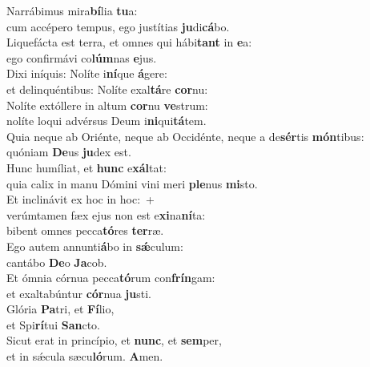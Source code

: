 \evenverse Narrábimus mira\textbf{bí}lia \textbf{tu}a:~\*\\
\evenverse cum accépero tempus, ego justítias \textbf{ju}di\textbf{cá}bo.\\
\oddverse Liquefácta est terra, et omnes qui hábi\textbf{tant} in \textbf{e}a:~\*\\
\oddverse ego confirmávi co\textbf{lúm}nas \textbf{e}jus.\\
\evenverse Dixi iníquis: Nolíte i\textbf{ní}que \textbf{á}gere:~\*\\
\evenverse et delinquéntibus: Nolíte exal\textbf{tá}re \textbf{cor}nu:\\
\oddverse Nolíte extóllere in altum \textbf{cor}nu \textbf{ve}strum:~\*\\
\oddverse nolíte loqui advérsus Deum i\textbf{ni}qui\textbf{tá}tem.\\
\evenverse Quia neque ab Oriénte, neque ab Occidénte, neque a de\textbf{sér}tis \textbf{món}tibus:~\*\\
\evenverse quóniam \textbf{De}us \textbf{ju}dex est.\\
\oddverse Hunc humíliat, et \textbf{hunc} e\textbf{xál}tat:~\*\\
\oddverse quia calix in manu Dómini vini meri \textbf{ple}nus \textbf{mi}sto.\\
\evenverse Et inclinávit ex hoc in hoc:~+\\
\evenverse  verúmtamen fæx ejus non est e\textbf{xi}na\textbf{ní}ta:~\*\\
\evenverse bibent omnes pecca\textbf{tó}res \textbf{ter}ræ.\\
\oddverse Ego autem annunti\textbf{á}bo in \textbf{sǽ}culum:~\*\\
\oddverse cantábo \textbf{De}o \textbf{Ja}cob.\\
\evenverse Et ómnia córnua pecca\textbf{tó}rum con\textbf{frín}gam:~\*\\
\evenverse et exaltabúntur \textbf{cór}nua \textbf{ju}sti.\\
\oddverse Glória \textbf{Pa}tri, et \textbf{Fí}lio,~\*\\
\oddverse et Spi\textbf{rí}tui \textbf{San}cto.\\
\evenverse Sicut erat in princípio, et \textbf{nunc}, et \textbf{sem}per,~\*\\
\evenverse et in sǽcula sæcu\textbf{ló}rum. \textbf{A}men.\\
